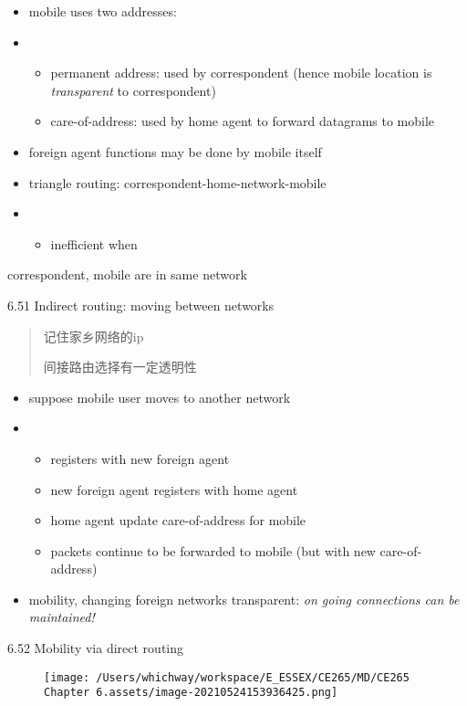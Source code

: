 \documentclass[
]{article}
\begin{document}
\begin{itemize}
\item
  mobile uses two addresses:
\item
  \begin{itemize}
  \item
    permanent address: used by correspondent (hence mobile location is
    \emph{transparent} to correspondent)
  \item
    care-of-address: used by home agent to forward datagrams to mobile
  \end{itemize}
\item
  foreign agent functions may be done by mobile itself
\item
  triangle routing: correspondent-home-network-mobile
\item
  \begin{itemize}
  \item
    inefficient when
  \end{itemize}
\end{itemize}

correspondent, mobile are in same network

6.51 Indirect routing: moving between networks

\begin{quote}
记住家乡网络的ip

间接路由选择有一定透明性
\end{quote}

\begin{itemize}
\item
  suppose mobile user moves to another network
\item
  \begin{itemize}
  \item
    registers with new foreign agent
  \item
    new foreign agent registers with home agent
  \item
    home agent update care-of-address for mobile
  \item
    packets continue to be forwarded to mobile (but with new
    care-of-address)
  \end{itemize}
\item
  mobility, changing foreign networks transparent: \emph{on going
  connections can be maintained!}
\end{itemize}

6.52 Mobility via direct routing

\begin{figure}
\centering
\texttt{[image: /Users/whichway/workspace/E\_ESSEX/CE265/MD/CE265 Chapter 6.assets/image-20210524153936425.png]}
\caption{}
\end{figure}
\end{document}
